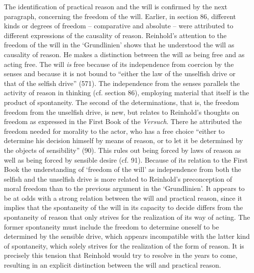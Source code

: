  The identification of practical reason and the will is confirmed by the next paragraph, concerning the freedom of the will. Earlier, in section 86, different kinds or degrees of freedom {--} comparative and absolute {--} were attributed to different expressions of the causality of reason. Reinhold's attention to the freedom of the will in the `Grundlinien' shows that he understood the will as causality of reason. He makes a distinction between the will as being free and as acting free. The will \textit{is }free because of its independence from coercion by the senses and because it is not bound to ``either the law of the unselfish drive or that of the selfish drive'' (571). The independence from the senses parallels the activity of reason in thinking (cf. section 86), employing material that itself is the product of spontaneity. The second of the determinations, that is, the freedom freedom from the unselfish drive, is new, but relates to Reinhold's thoughts on freedom as expressed in the First Book of the \textit{Versuch}. There he attributed the freedom needed for morality to the actor, who has a free choice ``either to determine his decision himself by means of reason, or to let it be determined by the objects of sensibility'' (90). This rules out being forced by laws of reason as well as being forced by sensible desire (cf. 91). Because of its relation to the First Book the understanding of `freedom of the will' as independence from both the selfish and the unselfish drive is more related to Reinhold's preconception of moral freedom than to the previous argument in the `Grundlinien'. It appears to be at odds with a strong relation between the will and practical reason, since it implies that the spontaneity of the will in its capacity to decide differs from the spontaneity of reason that only strives for the realization of its way of acting. The former spontaneity must include the freedom to determine oneself to be determined by the sensible drive, which appears incompatible with the latter kind of spontaneity, which solely strives for the realization of the form of reason. It is precisely this tension that Reinhold would try to resolve in the years to come, resulting in an explicit distinction between the will and practical reason. 

